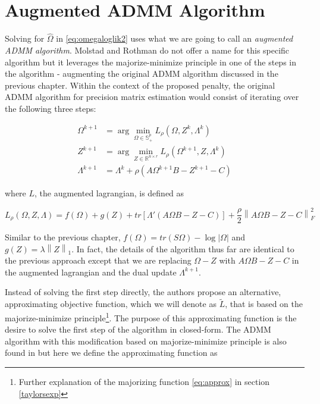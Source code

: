 \documentclass[11pt,]{report}
\theoremstyle{definition}
\theoremstyle{definition}
\theoremstyle{definition}
\theoremstyle{remark}
\begin{document}
\hypertarget{augmented-admm-algorithm}{%
\section{Augmented ADMM Algorithm}\label{augmented-admm-algorithm}}

Solving for \(\hat{\Omega}\) in \eqref{eq:omegaloglik2} uses what we are going to call an \emph{augmented ADMM algorithm}. Molstad and Rothman do not offer a name for this specific algorithm but it leverages the majorize-minimize principle in one of the steps in the algorithm - augmenting the original ADMM algorithm discussed in the previous chapter. Within the context of the proposed penalty, the original ADMM algorithm for precision matrix estimation would consist of iterating over the following three steps:

\begin{align}
  \Omega^{k + 1} &= \arg\min_{\Omega \in \mathbb{S}_{+}^{p}}L_{\rho}(\Omega, Z^{k}, \Lambda^{k}) \\
  Z^{k + 1} &= \arg\min_{Z \in \mathbb{R}^{n \times r}}L_{\rho}(\Omega^{k + 1}, Z, \Lambda^{k}) \\
  \Lambda^{k + 1} &= \Lambda^{k} + \rho\left(A\Omega^{k + 1}B - Z^{k + 1} - C \right)
\end{align}

where \(L\), the augmented lagrangian, is defined as

\begin{equation}
L_{\rho}(\Omega, Z, \Lambda) = f\left(\Omega\right) + g\left(Z\right) + tr\left[\Lambda '\left(A\Omega B - Z - C\right)\right] + \frac{\rho}{2}\left\|A\Omega B - Z - C\right\|_{F}^{2}
\label{eq:auglagrange3}
\end{equation}

Similar to the previous chapter, \(f\left(\Omega\right) = tr\left(S\Omega\right) - \log\left|\Omega\right|\) and \(g\left(Z\right) = \lambda\left\|Z\right\|_{1}\). In fact, the details of the algorithm thus far are identical to the previous approach except that we are replacing \(\Omega - Z\) with \(A\Omega B - Z - C\) in the augmented lagrangian and the dual update \(\Lambda^{k + 1}\).

Instead of solving the first step directly, the authors propose an alternative, approximating objective function, which we will denote as \(\tilde{L}\), that is based on the majorize-minimize principle\footnote{Further explanation of the majorizing function \eqref{eq:approx} in section \ref{taylorsexp}}. The purpose of this approximating function is the desire to solve the first step of the algorithm in closed-form. The ADMM algorithm with this modification based on majorize-minimize principle is also found in \citet{lange2016mm} but here we define the approximating function as
\end{document}

